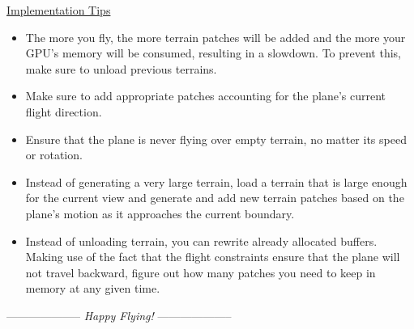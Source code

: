 \documentclass[addpoints]{exam}
\begin{document}
\begin{questions}
    \noindent\underline{Implementation Tips}
    \begin{itemize}
    \item The more you fly, the more terrain patches will be added and the more your GPU's memory will be consumed, resulting in a slowdown. To prevent this, make sure to unload previous terrains.
    \item Make sure to add appropriate patches accounting for the plane's current flight direction. 
    \item Ensure that the plane is never flying over empty terrain, no matter its speed or rotation.
    \item Instead of generating a very large terrain, load a terrain that is large enough for the current view and generate and add new terrain patches based on the plane's motion as it approaches the current boundary.
    \item Instead of unloading terrain, you can rewrite already allocated buffers. Making use of the fact that the flight constraints ensure that the plane will not travel backward, figure out how many patches you need to keep in memory at any given time.
    \end{itemize}
\end{questions}
\bigskip
  \centerline{-------------------- \textit{Happy Flying!} --------------------}
\end{document}
